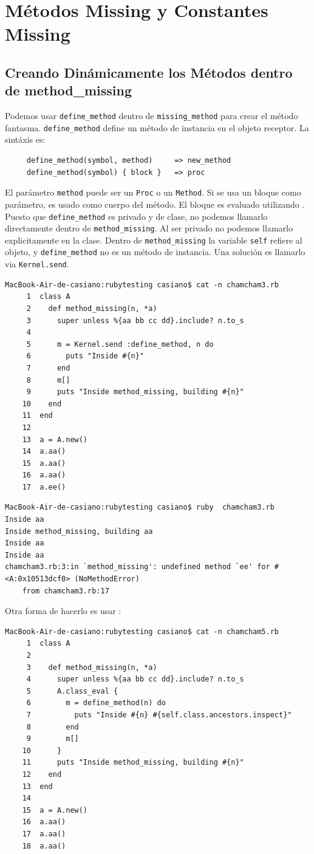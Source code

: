 \section{Métodos Missing y Constantes Missing}
\subsection{Creando Dinámicamente los Métodos dentro de method\_missing}

Podemos usar \verb|define_method| dentro de \verb|missing_method| para crear
el método fantasma. \verb|define_method| define un método de instancia en el objeto receptor.
La sintáxis es:

\begin{verbatim}
     define_method(symbol, method)     => new_method
     define_method(symbol) { block }   => proc
\end{verbatim}

El parámetro \verb|method| puede ser un \verb|Proc| o un \verb|Method|.
Si se usa un bloque como parámetro, es usado como cuerpo del método.
El bloque es evaluado utilizando .
Puesto que \verb|define_method| es privado y de clase, no podemos llamarlo
directamente dentro de \verb|method_missing|. Al ser privado no podemos llamarlo
explicitamente en la clase. Dentro de \verb|method_missing| la variable \verb|self|
refiere al objeto, y \verb|define_method| no es un método de instancia.
Una solución es llamarlo via \verb|Kernel.send|.

\begin{verbatim}
MacBook-Air-de-casiano:rubytesting casiano$ cat -n chamcham3.rb 
     1  class A
     2    def method_missing(n, *a)
     3      super unless %{aa bb cc dd}.include? n.to_s
     4  
     5      m = Kernel.send :define_method, n do 
     6        puts "Inside #{n}" 
     7      end
     8      m[]
     9      puts "Inside method_missing, building #{n}" 
    10    end
    11  end
    12  
    13  a = A.new()
    14  a.aa()
    15  a.aa()
    16  a.aa()
    17  a.ee()
\end{verbatim}

\begin{verbatim}
MacBook-Air-de-casiano:rubytesting casiano$ ruby  chamcham3.rb 
Inside aa
Inside method_missing, building aa
Inside aa
Inside aa
chamcham3.rb:3:in `method_missing': undefined method `ee' for #<A:0x10513dcf0> (NoMethodError)
    from chamcham3.rb:17
\end{verbatim}

Otra forma de hacerlo es usar :
\begin{verbatim}
MacBook-Air-de-casiano:rubytesting casiano$ cat -n chamcham5.rb 
     1  class A
     2  
     3    def method_missing(n, *a)
     4      super unless %{aa bb cc dd}.include? n.to_s
     5      A.class_eval {
     6        m = define_method(n) do 
     7          puts "Inside #{n} #{self.class.ancestors.inspect}" 
     8        end
     9        m[]
    10      }
    11      puts "Inside method_missing, building #{n}" 
    12    end
    13  end
    14  
    15  a = A.new()
    16  a.aa()
    17  a.aa()
    18  a.aa()
\end{verbatim}

